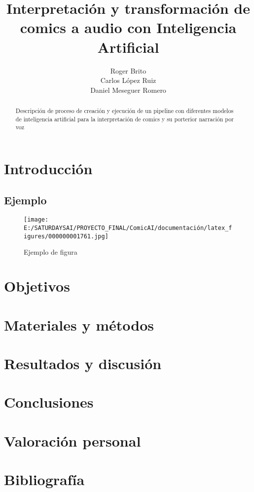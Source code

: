 \documentclass[a4paper,10pt]{article}
\title{Interpretación y transformación de comics a audio con Inteligencia Artificial}
\author{Roger Brito \\ Carlos López Ruiz \\ Daniel Meseguer Romero}
\begin{document}
\maketitle

\begin{abstract}
Descripción de proceso de creación y ejecución de un pipeline con diferentes modelos de inteligencia artificial 
para la interpretación de comics y su porterior narración por voz 
\end{abstract}

\tableofcontents

\newpage

    \section{Introducción}
        \subsection{Ejemplo}
            \begin{figure}[h]
                \texttt{[image: E:/SATURDAYSAI/PROYECTO\_FINAL/ComicAI/documentación/latex\_figures/000000001761.jpg]}
                \centering
                \caption{Ejemplo de figura}
                \centering
                \label{figure_1}
            \end{figure}
    
    \section{Objetivos}
    
    \section{Materiales y métodos}

    \section{Resultados y discusión}

    \section{Conclusiones}

    \section{Valoración personal}

    \section{Bibliografía}
    
    \newpage
    \listoffigures
\end{document}
